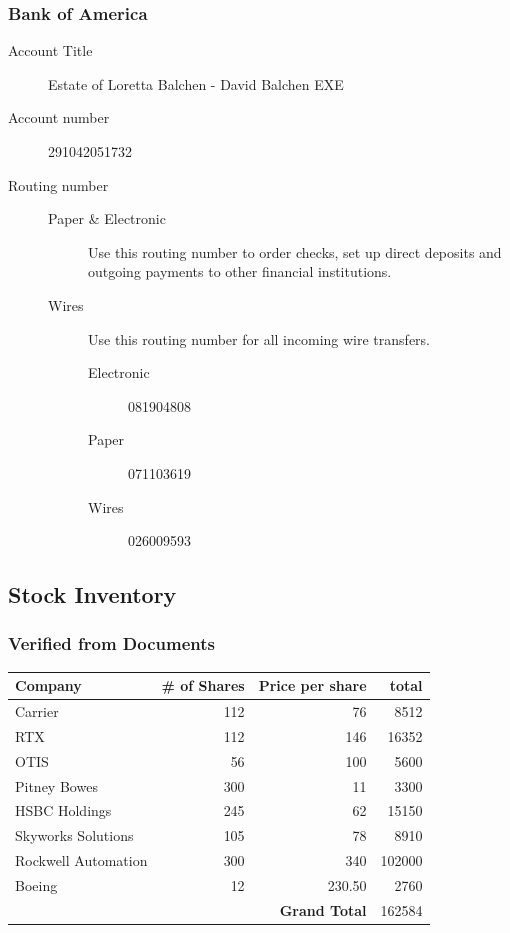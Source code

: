 \documentclass[12pt,twoside]{article}
\begin{document}
\subsubsection{Bank of America}
\label{sec:orgab2b79f}
\begin{description}
\item[{Account Title}] Estate of Loretta Balchen - David Balchen EXE
\item[{Account number}] 291042051732
\item[{Routing number}] \begin{description}
\item[{Paper \& Electronic}] Use this routing number to order checks, set up direct deposits and outgoing payments to other financial institutions.
\item[{Wires}] Use this routing number for all incoming wire transfers.

\begin{description}
\item[{Electronic}] 081904808
\item[{Paper}] 071103619
\item[{Wires}] 026009593
\end{description}
\end{description}
\end{description}
\subsection{Stock Inventory}
\label{sec:orge87c554}
\subsubsection{Verified from Documents}
\label{sec:orgdf8d494}
\begin{center}
\begin{tabular}{lrrr}
\hline
\textbf{Company} & \textbf{\# of Shares} & \textbf{Price per share} & \textbf{total}\\
\hline
Carrier & 112 & 76 & 8512\\
RTX & 112 & 146 & 16352\\
OTIS & 56 & 100 & 5600\\
Pitney Bowes & 300 & 11 & 3300\\
HSBC Holdings & 245 & 62 & 15150\\
Skyworks Solutions & 105 & 78 & 8910\\
Rockwell Automation & 300 & 340 & 102000\\
Boeing & 12 & 230.50 & 2760\\
\hline
 &  & \textbf{Grand Total} & 162584\\
\hline
\end{tabular}
\end{center}
\end{document}
